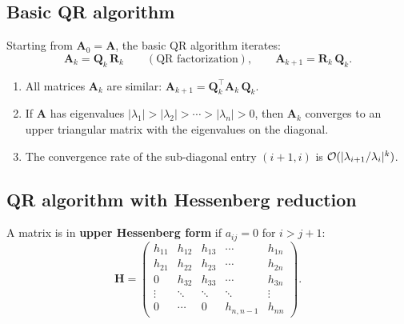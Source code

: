 \subsection{Basic QR algorithm}

\begin{definition}[QR algorithm]
\label{def:qr-algorithm}
Starting from $\mathbf{A}_0 = \mathbf{A}$, the basic QR algorithm iterates:
\[
    \mathbf{A}_k = \mathbf{Q}_k\,\mathbf{R}_k \qquad (\text{QR factorization}), \qquad
    \mathbf{A}_{k+1} = \mathbf{R}_k\,\mathbf{Q}_k.
\]
\end{definition}

\begin{proposition}
\label{prop:qr-properties}
\begin{enumerate}
    \item All matrices $\mathbf{A}_k$ are similar: $\mathbf{A}_{k+1} = \mathbf{Q}_k^\top\mathbf{A}_k\,\mathbf{Q}_k$.
    \item If $\mathbf{A}$ has eigenvalues $|\lambda_1| > |\lambda_2| > \cdots > |\lambda_n| > 0$, then $\mathbf{A}_k$ converges to an upper triangular matrix with the eigenvalues on the diagonal.
    \item The convergence rate of the sub-diagonal entry $(i+1,i)$ is $\mathcal{O}(|\lambda_{i+1}/\lambda_i|^k)$.
\end{enumerate}
\end{proposition}

\subsection{QR algorithm with Hessenberg reduction}

\begin{definition}
\label{def:hessenberg}
A matrix is in \textbf{upper Hessenberg form} if $a_{ij} = 0$ for $i > j+1$:
\[
    \mathbf{H} = \begin{pmatrix}
        h_{11} & h_{12} & h_{13} & \cdots & h_{1n} \\
        h_{21} & h_{22} & h_{23} & \cdots & h_{2n} \\
        0      & h_{32} & h_{33} & \cdots & h_{3n} \\
        \vdots & \ddots & \ddots & \ddots & \vdots \\
        0      & \cdots & 0      & h_{n,n-1} & h_{nn}
    \end{pmatrix}.
\]
\end{definition}

